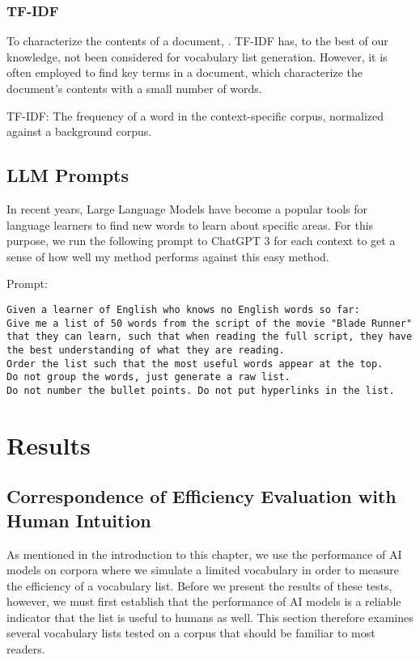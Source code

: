 \subsubsection{TF-IDF}
To characterize the contents of a document, \cite{qaiserTextMiningUse2018}.
TF-IDF has, to the best of our knowledge, not been considered for vocabulary list generation.
However, it is often employed to find key terms in a document, which characterize the document's contents with a small number of words.

TF-IDF: The frequency of a word in the context-specific corpus, normalized against a background corpus.

\subsection{LLM Prompts}
In recent years, Large Language Models have become a popular tools for language learners to find new words to learn about specific areas.
For this purpose, we run the following prompt to ChatGPT 3 for each context to get a sense of how well my method performs against this easy method.

Prompt:

\begin{lstlisting}[caption={Prompt given to the language model.}, label={lst:blade_runner_prompt}, captionpos=b]
	Given a learner of English who knows no English words so far:
Give me a list of 50 words from the script of the movie "Blade Runner" that they can learn, such that when reading the full script, they have the best understanding of what they are reading.
Order the list such that the most useful words appear at the top.
Do not group the words, just generate a raw list.
Do not number the bullet points. Do not put hyperlinks in the list.

\end{lstlisting}

\section{Results} \label{sec:results}

\subsection{Correspondence of Efficiency Evaluation with Human Intuition}
As mentioned in the introduction to this chapter, we use the performance of AI models on corpora where we simulate a limited vocabulary in order to measure the efficiency of a vocabulary list.
Before we present the results of these tests, however, we must first establish that the performance of AI models is a reliable indicator that the list is useful to humans as well.
This section therefore examines several vocabulary lists tested on a corpus that should be familiar to most readers.

